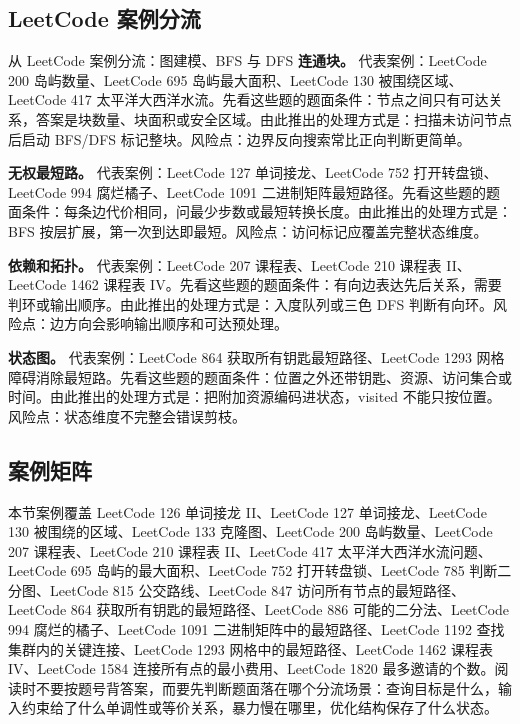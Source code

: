 \subsection{LeetCode 案例分流}

\begin{principlebox}{从 LeetCode 案例分流：图建模、BFS 与 DFS}
\textbf{连通块。}
代表案例：LeetCode 200 岛屿数量、LeetCode 695 岛屿最大面积、LeetCode 130 被围绕区域、LeetCode 417 太平洋大西洋水流。先看这些题的题面条件：节点之间只有可达关系，答案是块数量、块面积或安全区域。由此推出的处理方式是：扫描未访问节点后启动 BFS/DFS 标记整块。风险点：边界反向搜索常比正向判断更简单。

\textbf{无权最短路。}
代表案例：LeetCode 127 单词接龙、LeetCode 752 打开转盘锁、LeetCode 994 腐烂橘子、LeetCode 1091 二进制矩阵最短路径。先看这些题的题面条件：每条边代价相同，问最少步数或最短转换长度。由此推出的处理方式是：BFS 按层扩展，第一次到达即最短。风险点：访问标记应覆盖完整状态维度。

\textbf{依赖和拓扑。}
代表案例：LeetCode 207 课程表、LeetCode 210 课程表 II、LeetCode 1462 课程表 IV。先看这些题的题面条件：有向边表达先后关系，需要判环或输出顺序。由此推出的处理方式是：入度队列或三色 DFS 判断有向环。风险点：边方向会影响输出顺序和可达预处理。

\textbf{状态图。}
代表案例：LeetCode 864 获取所有钥匙最短路径、LeetCode 1293 网格障碍消除最短路。先看这些题的题面条件：位置之外还带钥匙、资源、访问集合或时间。由此推出的处理方式是：把附加资源编码进状态，visited 不能只按位置。风险点：状态维度不完整会错误剪枝。

\end{principlebox}

\subsection{案例矩阵}

本节案例覆盖 LeetCode 126 单词接龙 II、LeetCode 127 单词接龙、LeetCode 130 被围绕的区域、LeetCode 133 克隆图、LeetCode 200 岛屿数量、LeetCode 207 课程表、LeetCode 210 课程表 II、LeetCode 417 太平洋大西洋水流问题、LeetCode 695 岛屿的最大面积、LeetCode 752 打开转盘锁、LeetCode 785 判断二分图、LeetCode 815 公交路线、LeetCode 847 访问所有节点的最短路径、LeetCode 864 获取所有钥匙的最短路径、LeetCode 886 可能的二分法、LeetCode 994 腐烂的橘子、LeetCode 1091 二进制矩阵中的最短路径、LeetCode 1192 查找集群内的关键连接、LeetCode 1293 网格中的最短路径、LeetCode 1462 课程表 IV、LeetCode 1584 连接所有点的最小费用、LeetCode 1820 最多邀请的个数。阅读时不要按题号背答案，而要先判断题面落在哪个分流场景：查询目标是什么，输入约束给了什么单调性或等价关系，暴力慢在哪里，优化结构保存了什么状态。

